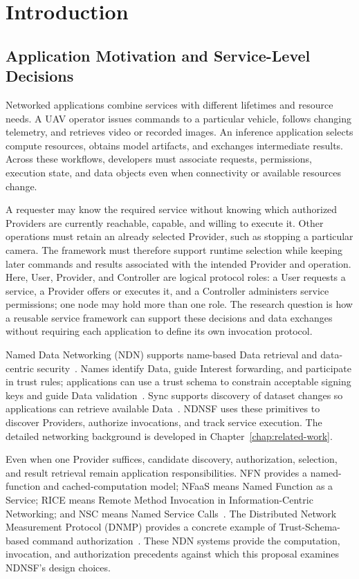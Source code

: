 \chapter{Introduction}
\label{chap:introduction}
\section{Application Motivation and Service-Level Decisions}
Networked applications combine services with different lifetimes and resource needs. A UAV operator issues commands to a particular vehicle, follows changing telemetry, and retrieves video or recorded images. An inference application selects compute resources, obtains model artifacts, and exchanges intermediate results. Across these workflows, developers must associate requests, permissions, execution state, and data objects even when connectivity or available resources change.

A requester may know the required service without knowing which authorized Providers are currently reachable, capable, and willing to execute it. Other operations must retain an already selected Provider, such as stopping a particular camera. The framework must therefore support runtime selection while keeping later commands and results associated with the intended Provider and operation. Here, User, Provider, and Controller are logical protocol roles: a User requests a service, a Provider offers or executes it, and a Controller administers service permissions; one node may hold more than one role. The research question is how a reusable service framework can support these decisions and data exchanges without requiring each application to define its own invocation protocol.

Named Data Networking (NDN) supports name-based Data retrieval and data-centric security~\cite{ndn,ndnpacket}. Names identify Data, guide Interest forwarding, and participate in trust rules; applications can use a trust schema to constrain acceptable signing keys and guide Data validation~\cite{trustschema}. Sync supports discovery of dataset changes so applications can retrieve available Data~\cite{li2018brief,moll2022sok}. NDNSF uses these primitives to discover Providers, authorize invocations, and track service execution. The detailed networking background is developed in Chapter~\ref{chap:related-work}.

Even when one Provider suffices, candidate discovery, authorization, selection, and result retrieval remain application responsibilities. NFN provides a named-function and cached-computation model; NFaaS means Named Function as a Service; RICE means Remote Method Invocation in Information-Centric Networking; and NSC means Named Service Calls~\cite{nfn,nfaas,rice,nsc}. The Distributed Network Measurement Protocol (DNMP) provides a concrete example of Trust-Schema-based command authorization~\cite{dnmp}. These NDN systems provide the computation, invocation, and authorization precedents against which this proposal examines NDNSF's design choices.

